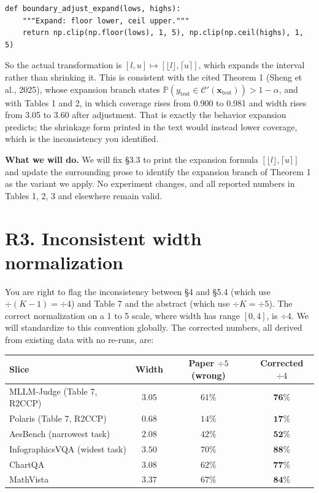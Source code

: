 \documentclass[11pt]{article}
\begin{document}
\begin{lstlisting}
def boundary_adjust_expand(lows, highs):
    """Expand: floor lower, ceil upper."""
    return np.clip(np.floor(lows), 1, 5), np.clip(np.ceil(highs), 1, 5)
\end{lstlisting}

So the actual transformation is $[l, u] \mapsto [\lfloor l \rfloor, \lceil u \rceil]$, which expands the interval rather than shrinking it. This is consistent with the cited Theorem 1 (Sheng et al., 2025), whose expansion branch states $\mathbb{P}(y_{\text{test}} \in \mathcal{C}'(\mathbf{x}_{\text{test}})) > 1 - \alpha$, and with Tables 1 and 2, in which coverage rises from 0.900 to 0.981 and width rises from 3.05 to 3.60 after adjustment. That is exactly the behavior expansion predicts; the shrinkage form printed in the text would instead lower coverage, which is the inconsistency you identified.

\textbf{What we will do.} We will fix \S 3.3 to print the expansion formula $[\lfloor l \rfloor, \lceil u \rceil]$ and update the surrounding prose to identify the expansion branch of Theorem 1 as the variant we apply. No experiment changes, and all reported numbers in Tables 1, 2, 3 and elsewhere remain valid.

\section*{R3. Inconsistent width normalization}

You are right to flag the inconsistency between \S 4 and \S 5.4 (which use $\div(K-1) = \div 4$) and Table 7 and the abstract (which use $\div K = \div 5$). The correct normalization on a 1 to 5 scale, where width has range $[0, 4]$, is $\div 4$. We will standardize to this convention globally. The corrected numbers, all derived from existing data with no re-runs, are:

\begin{center}
\small
\begin{tabular}{lccc}
\toprule
\textbf{Slice} & \textbf{Width} & \textbf{Paper $\div 5$ (wrong)} & \textbf{Corrected $\div 4$} \\
\midrule
MLLM-Judge (Table 7, R2CCP) & $3.05$ & $61\%$ & $\mathbf{76\%}$ \\
Polaris (Table 7, R2CCP)    & $0.68$ & $14\%$ & $\mathbf{17\%}$ \\
AesBench (narrowest task)   & $2.08$ & $42\%$ & $\mathbf{52\%}$ \\
InfographicsVQA (widest task) & $3.50$ & $70\%$ & $\mathbf{88\%}$ \\
ChartQA                     & $3.08$ & $62\%$ & $\mathbf{77\%}$ \\
MathVista                   & $3.37$ & $67\%$ & $\mathbf{84\%}$ \\
\bottomrule
\end{tabular}
\end{center}
\end{document}
